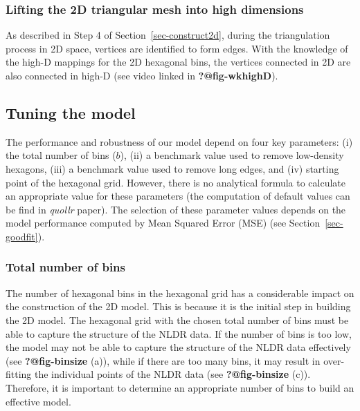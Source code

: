 \documentclass[
  12pt]{article}
\begin{document}
\hypertarget{lifting-the-2d-triangular-mesh-into-high-dimensions}{%
\subsubsection{Lifting the 2D triangular mesh into high
dimensions}\label{lifting-the-2d-triangular-mesh-into-high-dimensions}}

As described in Step 4 of Section~\ref{sec-construct2d}, during the
triangulation process in 2D space, vertices are identified to form
edges. With the knowledge of the high-D mappings for the 2D hexagonal
bins, the vertices connected in 2D are also connected in high-D (see
video linked in \textbf{?@fig-wkhighD}).

\hypertarget{tuning-the-model}{%
\subsection{Tuning the model}\label{tuning-the-model}}

The performance and robustness of our model depend on four key
parameters: (i) the total number of bins (\(b\)), (ii) a benchmark value
used to remove low-density hexagons, (iii) a benchmark value used to
remove long edges, and (iv) starting point of the hexagonal grid.
However, there is no analytical formula to calculate an appropriate
value for these parameters (the computation of default values can be
find in \emph{quollr} paper). The selection of these parameter values
depends on the model performance computed by Mean Squared Error (MSE)
(see Section~\ref{sec-goodfit}).

\hypertarget{total-number-of-bins}{%
\subsubsection{Total number of bins}\label{total-number-of-bins}}

The number of hexagonal bins in the hexagonal grid has a considerable
impact on the construction of the 2D model. This is because it is the
initial step in building the 2D model. The hexagonal grid with the
chosen total number of bins must be able to capture the structure of the
NLDR data. If the number of bins is too low, the model may not be able
to capture the structure of the NLDR data effectively (see
\textbf{?@fig-binsize} (a)), while if there are too many bins, it may
result in over-fitting the individual points of the NLDR data (see
\textbf{?@fig-binsize} (c)). Therefore, it is important to determine an
appropriate number of bins to build an effective model.
\end{document}
